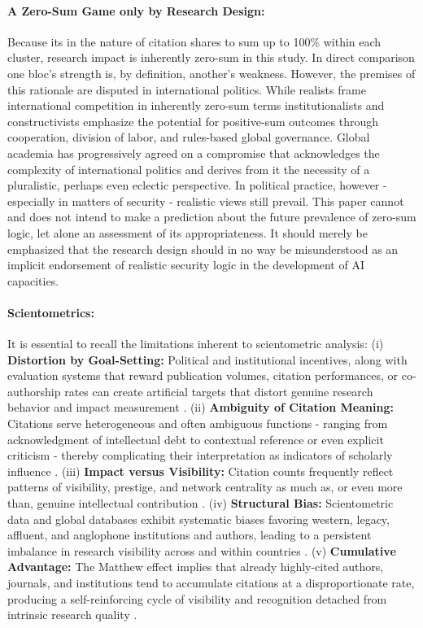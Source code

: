 \documentclass{article}
\begin{document}
	\paragraph{A Zero-Sum Game only by Research Design:} Because its in the nature of citation shares to sum up to 100\% within each cluster, research impact is inherently zero-sum in this study. In direct comparison one bloc’s strength is, by definition, another’s weakness. However, the premises of this rationale are disputed in international politics. While realists frame international competition in inherently zero-sum terms institutionalists and constructivists emphasize the potential for positive-sum outcomes through cooperation, division of labor, and rules-based global governance. Global academia has progressively agreed on a compromise that acknowledges the complexity of international politics and derives from it the necessity of a pluralistic, perhaps even eclectic perspective. In political practice, however - especially in matters of security - realistic views still prevail. This paper cannot and does not intend to make a prediction about the future prevalence of zero-sum logic, let alone an assessment of its appropriateness. It should merely be emphasized that the research design should in no way be misunderstood as an implicit endorsement of realistic security logic in the development of AI capacities.
	
	\paragraph{Scientometrics:} It is essential to recall the limitations inherent to scientometric analysis: (i) \textbf{Distortion by Goal-Setting:} Political and institutional incentives, along with evaluation systems that reward publication volumes, citation performances, or co-authorship rates can create artificial targets that distort genuine research behavior and impact measurement \cite{baccini2019citation, fire2018over}. (ii) \textbf{Ambiguity of Citation Meaning:} Citations serve heterogeneous and often ambiguous functions - ranging from acknowledgment of intellectual debt to contextual reference or even explicit criticism - thereby complicating their interpretation as indicators of scholarly influence \cite{adler2009citation, waltman2016review}. (iii) \textbf{Impact versus Visibility:} Citation counts frequently reflect patterns of visibility, prestige, and network centrality as much as, or even more than, genuine intellectual contribution \cite{waltman2016review}. (iv) \textbf{Structural Bias:} Scientometric data and global databases exhibit systematic biases favoring western, legacy, affluent, and anglophone institutions and authors, leading to a persistent imbalance in research visibility across and within countries \cite{Maddi2025GeographicalDisciplinaryCoverage, gomez2022leading}. (v) \textbf{Cumulative Advantage:} The Matthew effect implies that already highly-cited authors, journals, and institutions tend to accumulate citations at a disproportionate rate, producing a self-reinforcing cycle of visibility and recognition detached from intrinsic research quality \cite{wang2013quantifying, lariviere2009impact}.
	
\end{document}
